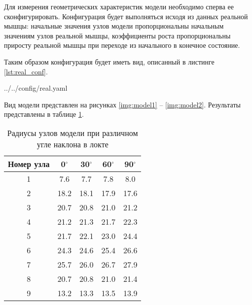Для измерения геометрических характеристик модели необходимо сперва ее сконфигурировать. Конфигурация будет выполняться исходя из данных реальной мышцы: начальные значения узлов модели пропорциональны начальным значениям узлов реальной мышцы, коэффициенты роста пропорциональны приросту реальной мышцы при переходе из начального в конечное состояние.

Таким образом конфигурация будет иметь вид, описанный в листинге \ref{lst:real_conf}.

\begin{lstinputlisting}[
        caption={Конфигурация модели, параметры которой пропорциональны реальной мышце.},
        label={lst:real_conf},
        style={rust}
    ]{../../config/real.yaml}
\end{lstinputlisting}

Вид модели представлен на рисунках \ref{img:model1} -- \ref{img:model2}. Результаты представлены в таблице \ref{tab:model}. 


\begin{table}[!h]
    \begin{center}
        \begin{tabular}{|c|c|c|c|c|}
            \hline
            Номер узла & 0$^\circ$ & 30$^\circ$ & 60$^\circ$ & 90$^\circ$ \\
            \hline
            \hline
            1 & 7.6 &   7.7 &  7.8 &  8.0 \\
            \hline
            2 & 18.2 & 18.1 & 17.9 & 17.6 \\
            \hline
            3 & 20.7 & 20.8 & 21.0 & 21.2 \\
            \hline
            4 & 21.2 & 21.3 & 21.7 & 22.3 \\
            \hline
            5 & 21.7 & 22.1 & 23.0 & 24.4 \\
            \hline
            6 & 24.3 & 24.6 & 25.4 & 26.6 \\
            \hline
            7 & 25.7 & 26.0 & 26.7 & 27.9 \\
            \hline
            8 & 20.7 & 20.8 & 21.0 & 21.4 \\
            \hline
            9 & 13.2 & 13.3 & 13.5 & 13.9 \\
            \hline
        \end{tabular}
    \end{center}
    \caption{\label{tab:model} Радиусы узлов модели при различном угле наклона в локте}
\end{table}

